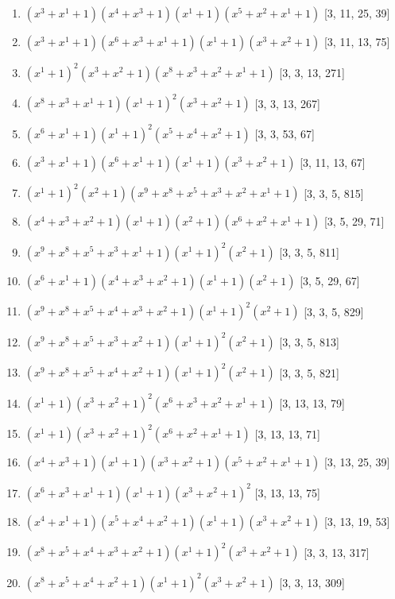 \documentclass[10pt,twocolumn]{article}
\begin{document}
\begin{enumerate}
\item $(x^{3} + x^{1} + 1)(x^{4} + x^{3} + 1)(x^{1} + 1)(x^{5} + x^{2} + x^{1} + 1)$  [3, 11, 25, 39]
\item $(x^{3} + x^{1} + 1)(x^{6} + x^{3} + x^{1} + 1)(x^{1} + 1)(x^{3} + x^{2} + 1)$  [3, 11, 13, 75]
\item $(x^{1} + 1)^{2}(x^{3} + x^{2} + 1)(x^{8} + x^{3} + x^{2} + x^{1} + 1)$  [3, 3, 13, 271]
\item $(x^{8} + x^{3} + x^{1} + 1)(x^{1} + 1)^{2}(x^{3} + x^{2} + 1)$  [3, 3, 13, 267]
\item $(x^{6} + x^{1} + 1)(x^{1} + 1)^{2}(x^{5} + x^{4} + x^{2} + 1)$  [3, 3, 53, 67]
\item $(x^{3} + x^{1} + 1)(x^{6} + x^{1} + 1)(x^{1} + 1)(x^{3} + x^{2} + 1)$  [3, 11, 13, 67]
\item $(x^{1} + 1)^{2}(x^{2} + 1)(x^{9} + x^{8} + x^{5} + x^{3} + x^{2} + x^{1} + 1)$  [3, 3, 5, 815]
\item $(x^{4} + x^{3} + x^{2} + 1)(x^{1} + 1)(x^{2} + 1)(x^{6} + x^{2} + x^{1} + 1)$  [3, 5, 29, 71]
\item $(x^{9} + x^{8} + x^{5} + x^{3} + x^{1} + 1)(x^{1} + 1)^{2}(x^{2} + 1)$  [3, 3, 5, 811]
\item $(x^{6} + x^{1} + 1)(x^{4} + x^{3} + x^{2} + 1)(x^{1} + 1)(x^{2} + 1)$  [3, 5, 29, 67]
\item $(x^{9} + x^{8} + x^{5} + x^{4} + x^{3} + x^{2} + 1)(x^{1} + 1)^{2}(x^{2} + 1)$  [3, 3, 5, 829]
\item $(x^{9} + x^{8} + x^{5} + x^{3} + x^{2} + 1)(x^{1} + 1)^{2}(x^{2} + 1)$  [3, 3, 5, 813]
\item $(x^{9} + x^{8} + x^{5} + x^{4} + x^{2} + 1)(x^{1} + 1)^{2}(x^{2} + 1)$  [3, 3, 5, 821]
\item $(x^{1} + 1)(x^{3} + x^{2} + 1)^{2}(x^{6} + x^{3} + x^{2} + x^{1} + 1)$  [3, 13, 13, 79]
\item $(x^{1} + 1)(x^{3} + x^{2} + 1)^{2}(x^{6} + x^{2} + x^{1} + 1)$  [3, 13, 13, 71]
\item $(x^{4} + x^{3} + 1)(x^{1} + 1)(x^{3} + x^{2} + 1)(x^{5} + x^{2} + x^{1} + 1)$  [3, 13, 25, 39]
\item $(x^{6} + x^{3} + x^{1} + 1)(x^{1} + 1)(x^{3} + x^{2} + 1)^{2}$  [3, 13, 13, 75]
\item $(x^{4} + x^{1} + 1)(x^{5} + x^{4} + x^{2} + 1)(x^{1} + 1)(x^{3} + x^{2} + 1)$  [3, 13, 19, 53]
\item $(x^{8} + x^{5} + x^{4} + x^{3} + x^{2} + 1)(x^{1} + 1)^{2}(x^{3} + x^{2} + 1)$  [3, 3, 13, 317]
\item $(x^{8} + x^{5} + x^{4} + x^{2} + 1)(x^{1} + 1)^{2}(x^{3} + x^{2} + 1)$  [3, 3, 13, 309]

\end{enumerate}
\end{document}
